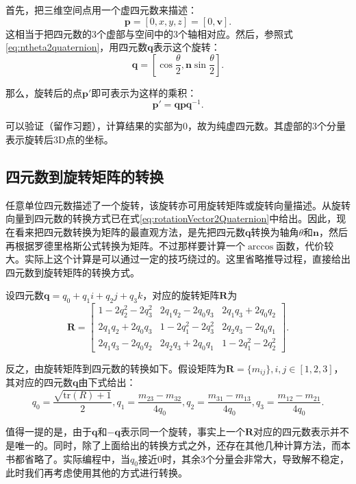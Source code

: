 首先，把三维空间点用一个虚四元数来描述：
\[
\bm{p} = [0, x, y, z] = [0, \bm{v}]. 
\]
这相当于把四元数的3个虚部与空间中的3个轴相对应。然后，参照式\eqref{eq:ntheta2quaternion}，用四元数$\bm{q}$表示这个旋转：
\[
\bm{q} = [\cos \frac{\theta}{2}, \bm{n} \sin \frac{\theta}{2} ].
\]

那么，旋转后的点$\bm{p}'$即可表示为这样的乘积：
\begin{equation}
\bm{p}' = \bm{q} \bm{p} \bm{q}^{-1}.
\end{equation}

可以验证（留作习题），计算结果的实部为0，故为纯虚四元数。其虚部的3个分量表示旋转后3D点的坐标。

\subsection{四元数到旋转矩阵的转换}
任意单位四元数描述了一个旋转，该旋转亦可用旋转矩阵或旋转向量描述。从旋转向量到四元数的转换方式已在式\eqref{eq:rotationVector2Quaternion}中给出。因此，现在看来把四元数转换为矩阵的最直观方法，是先把四元数$\bm{q}$转换为轴角$\theta$和$\bm{n}$，然后再根据罗德里格斯公式转换为矩阵。不过那样要计算一个$\arccos$函数，代价较大。实际上这个计算是可以通过一定的技巧绕过的。这里省略推导过程，直接给出四元数到旋转矩阵的转换方式。

设四元数$\bm{q} = q_0+q_1i+q_2j+q_3k$，对应的旋转矩阵$\bm{R}$为
\begin{equation}
\bm{R} = \left[ {\begin{array}{*{20}{c}}
	 {1 - 2q_2^2 - 2q_3^2}&{2{q_1}{q_2} - 2{q_0}{q_3}}&{2{q_1}{q_3} + 2{q_0}{q_2}}\\
	 {2{q_1}{q_2} + 2{q_0}{q_3}}&{1 - 2q_1^2 - 2q_3^2}&{2{q_2}{q_3} - 2{q_0}{q_1}}\\
	 {2{q_1}{q_3} - 2{q_0}{q_2}}&{2{q_2}{q_3} + 2{q_0}{q_1}}&{1 - 2q_1^2 - 2q_2^2}
 \end{array}} \right].
\end{equation}

反之，由旋转矩阵到四元数的转换如下。假设矩阵为$\bm{R}=\{ m_{ij}\}, i, j \in \left[ 1, 2,3 \right] $，其对应的四元数$\bm{q}$由下式给出：
\begin{equation}
{q_0} = \frac{{\sqrt {\mathrm{tr}(R) + 1} }}{2},{q_1} = \frac{{{m_{23}} - {m_{32}}}}{{4{q_0}}},{q_2} = \frac{{{m_{31}} - {m_{13}}}}{{4{q_0}}},{q_3} = \frac{{{m_{12}} - {m_{21}}}}{{4{q_0}}}.
\end{equation}

值得一提的是，由于$\bm{q}$和$\bm{-q}$表示同一个旋转，事实上一个$\bm{R}$对应的四元数表示并不是唯一的。同时，除了上面给出的转换方式之外，还存在其他几种计算方法，而本书都省略了。实际编程中，当$q_0$接近0时，其余3个分量会非常大，导致解不稳定，此时我们再考虑使用其他的方式进行转换。


